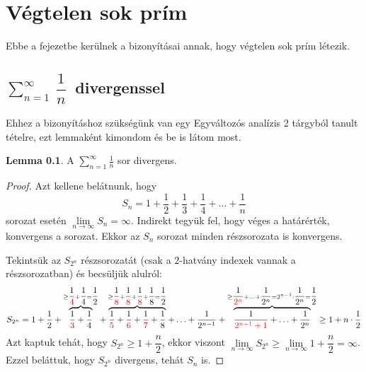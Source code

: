\documentclass[12pt]{book}
\theoremstyle{plain} %
\theoremstyle{definition} %
\newtheorem{lem/}{Lemma}[section]
\newenvironment{lem}
  {\renewcommand{\qedsymbol}{$\clubsuit$}%
   \pushQED{\qed}\begin{lem/}}
  {\popQED\end{lem/}}
\theoremstyle{remark}
\renewcommand\qedsymbol{$\blacksquare$}
\numberwithin{equation}{section}  %
\begin{document}
	
	\chapter*{Végtelen  sok prím}
	\setcounter{chapter}{\thechapter+1}
	\setcounter{section}{0}
	Ebbe a fejezetbe kerülnek a bizonyításai annak, hogy végtelen sok prím létezik.
	
	\section{$\displaystyle\sum_{n=1}^{\infty} \ \dfrac{1}{n}\ $ divergenssel}
	
	Ehhez a bizonyításhoz szükségünk van egy Egyváltozós analízis 2 tárgyból tanult tételre, ezt lemmaként kimondom és be is látom most.
	
	\begin{lem}\label{egypern}
		A $\sum\limits_{n=1}^{\infty} \frac{1}{n}$ sor divergens.
	\end{lem}

	\begin{proof}
		Azt kellene belátnunk, hogy
		\[ S_n = 1 + \dfrac{1}{2} + \dfrac{1}{3} + \dfrac{1}{4} + \ldots + \dfrac{1}{n} \]
		sorozat esetén $\lim\limits_{n\to \infty} S_n = \infty$. Indirekt tegyük fel, hogy véges a határérték, konvergens a sorozat. Ekkor az $S_n$ sorozat minden részsorozata is konvergens.
		
		Tekintsük az $S_{2^n}$ részsorozatát (csak a $2$-hatvány indexek vannak a részsorozatban) és becsüljük alulról:
		\[ S_{2^n} = 1 + \dfrac{1}{2} + \overbrace{ \dfrac{1}{\color{red}3} +\dfrac{1}{4} }^{\geq \dfrac{1}{\color{red}4}+\dfrac{1}{4} = \dfrac{1}{2}} +\overbrace{ \dfrac{1}{\color{red}5}+\dfrac{1}{\color{red}6}+\dfrac{1}{\color{red}7}+\dfrac{1}{8}}^{\geq \dfrac{1}{\color{red}8}+\dfrac{1}{\color{red}8}+\dfrac{1}{\color{red}8}+\dfrac{1}{8} = \dfrac{1}{2}} +\ldots + \dfrac{1}{2^{n-1}} + \overbrace{ \dfrac{1}{\color{red}2^{n-1}+1} + \ldots + \dfrac{1}{2^n} }^{\geq \dfrac{1}{\color{red}2^n} + \ldots + \dfrac{1}{2^n} = 2^{n-1} \cdot \dfrac{1}{2^n} = \dfrac{1}{2}} \geq 1 + n\cdot \dfrac{1}{2} \]
		Azt kaptuk tehát, hogy $S_{2^n}\geq 1+\dfrac{n}{2}$, ekkor viszont $\lim\limits_{n\to \infty} S_{2^n} \geq \lim\limits_{n\to \infty} 1+\dfrac{n}{2} = \infty$. Ezzel beláttuk, hogy $S_{2^n}$ divergens, tehát $S_n$ is.
	\end{proof}
\end{document}
